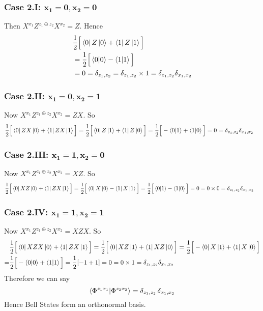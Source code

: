 \documentclass[a4paper, 11pt]{article}
\begin{document}
{\subsubsection*{Case 2.I: $\boldsymbol{x_1=0,x_2=0}$}
Then $X^{x_1}Z^{z_1\oplus z_2}X^{x_2}=Z$. Hence \begin{align*}
	& \frac12 \Big[ \bra{0}Z\ket{0}+\bra{1}Z\ket{1}  \Big]\\
	& = \frac12 \Big[ \bra{0}\ket{0}-\bra{1}\ket{1}   \Big]\\
	& = 0 = \delta_{z_1,z_2}=\delta_{z_1,z_2}\times 1=\delta_{z_1,z_2}\delta_{x_1,x_2}
\end{align*}
\subsubsection*{Case 2.II: $\boldsymbol{x_1=0,x_2=1}$}
Now $X^{x_1}Z^{z_1\oplus z_2}X^{x_2}=ZX$. 
So \begin{align*}
	&\frac12 \Big[\bra{0}ZX\ket{0}+\bra{1}ZX\ket{1}\Big] =\frac12 \Big[\bra{0}Z\ket{1}+\bra{1}Z\ket{0}\Big]=\frac12 \Big[-\bra{0}\ket{1}+\bra{1}\ket{0}\Big]	= 0=\delta_{z_1,z_2}\delta_{x_1,x_2}
\end{align*}
\subsubsection*{Case 2.III: $\boldsymbol{x_1=1,x_2=0}$}
Now $X^{x_1}Z^{z_1\oplus z_2}X^{x_2}=XZ$. 
So \begin{align*}
	&\frac12 \Big[\bra{0}XZ\ket{0}+\bra{1}ZX\ket{1}\Big] =\frac12 \Big[\bra{0}X\ket{0}-\bra{1}X\ket{1}\Big]=\frac12 \Big[\bra{0}\ket{1}-\bra{1}\ket{0}\Big]	= 0 = 0\times 0=\delta_{z_1,z_2}\delta_{x_1,x_2}
\end{align*}
\subsubsection*{Case 2.IV: $\boldsymbol{x_1=1,x_2=1}$}
Now $X^{x_1}Z^{z_1\oplus z_2}X^{x_2}=XZX$. 
So \begin{align*}
	&\frac12 \Big[\bra{0}XZX\ket{0}+\bra{1}ZX\ket{1}\Big]=\frac12 \Big[\bra{0}XZ\ket{1}+\bra{1}XZ\ket{0}\Big]= \frac12 \Big[-\bra{0}X\ket{1}+\bra{1}X\ket{0}\Big]\\
	=& \frac12 \Big[-\bra{0}\ket{0}+\bra{1}\ket{1}\Big]	=  \frac12[-1+1]= 0 = 0\times 1 =\delta_{z_1,z_2}\delta_{x_1,x_2}
\end{align*}Therefore we can say $$\bra{\Phi^{z_1x_1}}\ket{\Phi^{z_2x_2}}=\delta_{z_1,z_2}\,\delta_{x_1,x_2}$$Hence Bell States form an orthonormal basis.

}
\end{document}
